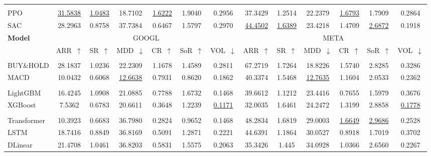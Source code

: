 \begin{table}[htb]
{\begin{tabular}{lcccccccccccc}
\rowcolor{gray!15}
\multicolumn{13}{c}{\textit{\textbf{RL-based}}} \\
PPO & \underline{31.5838} & \underline{1.0483} & 18.7102 & \underline{1.6222} & 1.9040 & 0.2956 & 37.3429 & 1.2514 & 22.2379 & \underline{1.6793} & 1.7909 & 0.2864 \\
SAC & 28.2963 & 0.8758 & 37.7384 & 0.6467 & 1.5797 & 0.2970 & \underline{44.4502} & \underline{1.6389} & 23.4218 & 1.4709 & \underline{2.6872} & 0.1918 \\

\bottomrule
\toprule


\multirow{2}{*}{\parbox{1.2cm}{\centering\textbf{Model}}}
    & \multicolumn{6}{c}{GOOGL}
    & \multicolumn{6}{c}{META} \\
    
\cmidrule(lr){2-7} \cmidrule(lr){8-13}
& ARR~$\uparrow$ & SR~$\uparrow$ & MDD~$\downarrow$ & CR~$\uparrow$ & SoR~$\uparrow$ & VOL~$\downarrow$
& ARR~$\uparrow$ & SR~$\uparrow$ & MDD~$\downarrow$ & CR~$\uparrow$ & SoR~$\uparrow$ & VOL~$\downarrow$ \\
\midrule

\rowcolor{gray!15}
\multicolumn{13}{c}{\textit{\textbf{Rule-based}}} \\
BUY\&HOLD & 28.1837 & 1.0236 & 22.2309 & 1.1678 & 1.4589 & 0.2811 & 67.2719 & 1.7264 & 18.8226 & 1.5740 & 2.8285 & 0.3286 \\
MACD & 10.0432 & 0.6068 & \underline{12.6638} & 0.7931 & 0.8620 & 0.1862 & 40.3374 & 1.5468 & \underline{12.7635} & 1.1604 & 2.0533 & 0.2362 \\

\rowcolor{gray!15}
\multicolumn{13}{c}{\textit{\textbf{ML-based}}} \\
LightGBM  & 16.4245 & 1.0908 & 21.0885 & 0.7788 & 1.6732 & 0.1468 & 39.6612 & 1.1212 & 23.4416 & 0.7655 & 1.5979 & 0.3676 \\
XGBoost  & 7.5362 & 0.6783 & 20.6611 & 0.3648 & 1.2239 & \underline{0.1171} & 32.0035 & 1.6461 & 24.2472 & 1.3199 & 2.8858 & \underline{0.1778} \\

\rowcolor{gray!15}
\multicolumn{13}{c}{\textit{\textbf{DL-based}}} \\
Transformer   & 10.3923 & 0.6683 & 36.7980 & 0.2824 & 0.9652 & 0.1468 & 48.2834 & 1.6819 & 29.0003 & \underline{1.6649} & \underline{2.9686} & 0.2528 \\
LSTM   & 18.7416 & 0.8849 & 36.8169 & 0.5091 & 1.2871 & 0.2221 & 44.6391 & 1.1864 & 30.0527 & 0.8918 & 1.7019 & 0.3702 \\
DLinear   & 21.4708 & 1.0461 & 36.8203 & 0.5831 & 1.5575 & 0.2063 & 35.3426 & 1.445 & 34.0928 & 1.0366 & 2.6560 & 0.2267 \\


\end{tabular}}
\end{table}
